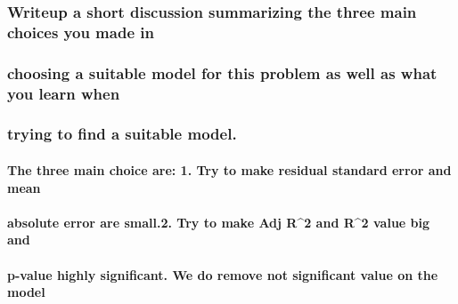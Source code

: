 \documentclass[
]{article}
\begin{document}
\hypertarget{writeup-a-short-discussion-summarizing-the-three-main-choices-you-made-in}{%
\subsubsection{Writeup a short discussion summarizing the three main
choices you made
in}\label{writeup-a-short-discussion-summarizing-the-three-main-choices-you-made-in}}

\hypertarget{choosing-a-suitable-model-for-this-problem-as-well-as-what-you-learn-when}{%
\subsubsection{choosing a suitable model for this problem as well as
what you learn
when}\label{choosing-a-suitable-model-for-this-problem-as-well-as-what-you-learn-when}}

\hypertarget{trying-to-find-a-suitable-model.}{%
\subsubsection{trying to find a suitable
model.}\label{trying-to-find-a-suitable-model.}}

\hypertarget{the-three-main-choice-are-1.-try-to-make-residual-standard-error-and-mean}{%
\paragraph{The three main choice are: 1. Try to make residual standard
error and
mean}\label{the-three-main-choice-are-1.-try-to-make-residual-standard-error-and-mean}}

\hypertarget{absolute-error-are-small.2.-try-to-make-adj-r2-and-r2-value-big-and}{%
\paragraph{absolute error are small.2. Try to make Adj R\^{}2 and R\^{}2
value big
and}\label{absolute-error-are-small.2.-try-to-make-adj-r2-and-r2-value-big-and}}

\hypertarget{p-value-highly-significant.-we-do-remove-not-significant-value-on-the-model}{%
\paragraph{p-value highly significant. We do remove not significant
value on the
model}\label{p-value-highly-significant.-we-do-remove-not-significant-value-on-the-model}}
\end{document}
